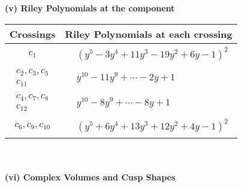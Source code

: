\documentclass[1p]{elsarticle_modified}
\theoremstyle{definition}
\begin{document}
\newpage\renewcommand{\arraystretch}{1}
\flushleft \textbf{(v) Riley Polynomials at the component}\newline \\
\begin{tabular}{m{50pt}|m{274pt}}
Crossings & \hspace{64pt}Riley Polynomials at each crossing \\
\hline $$\begin{aligned}c_{1}\end{aligned}$$&$\begin{aligned}
&(y^5-3 y^4+11 y^3-19 y^2+6 y-1)^2
\end{aligned}$\\
\hline $$\begin{aligned}c_{2},c_{3},c_{5}\\c_{11}\end{aligned}$$&$\begin{aligned}
&y^{10}-11 y^9+\cdots-2 y+1
\end{aligned}$\\
\hline $$\begin{aligned}c_{4},c_{7},c_{8}\\c_{12}\end{aligned}$$&$\begin{aligned}
&y^{10}-8 y^9+\cdots-8 y+1
\end{aligned}$\\
\hline $$\begin{aligned}c_{6},c_{9},c_{10}\end{aligned}$$&$\begin{aligned}
&(y^5+6 y^4+13 y^3+12 y^2+4 y-1)^2
\end{aligned}$\\
\hline
\end{tabular}\\~\\
\newpage\flushleft \textbf{(vi) Complex Volumes and Cusp Shapes}
\end{document}
